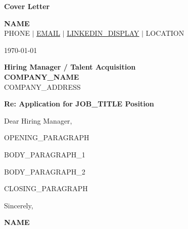 \documentclass[letterpaper,14pt]{article}
\begin{document}
\begin{center}
    \textbf{\Large Cover Letter}
\end{center}

\vspace{10pt}

\begin{center}
    \textbf{\Huge \scshape {{NAME}}} \\ \vspace{1pt}
    \small {{PHONE}} $|$ \href{mailto:{{EMAIL}}}{\underline{{{EMAIL}}}} $|$ 
    \href{{{LINKEDIN}}}{\underline{{{LINKEDIN_DISPLAY}}}} $|$
    \small {{LOCATION}}
\end{center}

\vspace{10pt}

\today

\vspace{15pt}

\textbf{Hiring Manager / Talent Acquisition} \\
\textbf{{{COMPANY_NAME}}} \\
{{COMPANY_ADDRESS}}

\vspace{15pt}

\textbf{Re: Application for {{JOB_TITLE}} Position}

\vspace{15pt}

Dear Hiring Manager,

\vspace{10pt}

{{OPENING_PARAGRAPH}}

\vspace{10pt}

{{BODY_PARAGRAPH_1}}

\vspace{10pt}

{{BODY_PARAGRAPH_2}}

\vspace{10pt}

{{CLOSING_PARAGRAPH}}

\vspace{20pt}

Sincerely,

\vspace{25pt}

\textbf{{{NAME}}}
\end{document}
